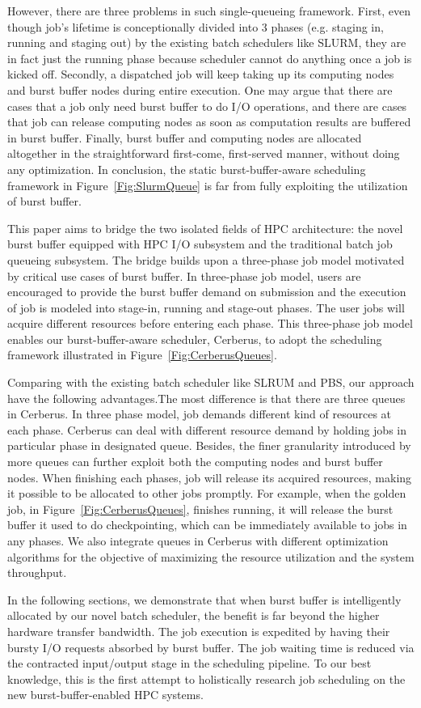 However, there are three problems in such single-queueing framework.
First, even though job's lifetime is conceptionally divided into 3 phases
(e.g. staging in, running and staging out) by the existing batch schedulers like SLURM,
they are in fact just the running phase because scheduler cannot do anything once a job is kicked off.
Secondly, a dispatched job will keep taking up its computing nodes and burst buffer nodes during entire execution.
One may argue that there are cases that a job only need burst buffer to do I/O operations,
and there are cases that job can release computing nodes as soon as computation results are buffered
in burst buffer.
Finally, burst buffer and computing nodes are allocated altogether
in the straightforward first-come, first-served manner, without doing any optimization.
In conclusion, the static burst-buffer-aware scheduling framework in Figure~\ref{Fig:SlurmQueue}
is far from fully exploiting the utilization of burst buffer.

This paper aims to bridge the two isolated fields of HPC architecture:
the novel burst buffer equipped with HPC I/O subsystem and the
traditional batch job queueing subsystem.
The bridge builds upon a three-phase job model motivated by critical use cases of burst buffer.
In three-phase job model, users are encouraged to provide the burst buffer demand on submission
and the execution of job is modeled into stage-in, running and stage-out phases.
The user jobs will acquire different resources before entering each phase.
This three-phase job model enables our burst-buffer-aware scheduler, Cerberus,
to adopt the scheduling framework illustrated in Figure~\ref{Fig:CerberusQueues}.

Comparing with the existing batch scheduler like SLRUM and PBS,
our approach have the following advantages.The most difference is that there are three queues in Cerberus.
In three phase model, job demands different kind of resources at each phase.
Cerberus can deal with different resource demand by holding jobs in particular phase in designated queue.
Besides, the finer granularity introduced by more queues can further exploit
both the computing nodes and burst buffer nodes.
When finishing each phases, job will release its acquired resources, making it possible
to be allocated to other jobs promptly.
For example, when the golden job, in Figure~\ref{Fig:CerberusQueues}, finishes running, it will release the burst buffer it used to
do checkpointing, which can be immediately available to jobs in any phases.
We also integrate queues in Cerberus with different optimization algorithms for the
objective of maximizing the resource utilization and the system throughput.

In the following sections, we demonstrate that when burst buffer is intelligently allocated
by our novel batch scheduler, the benefit is far beyond the higher hardware transfer bandwidth.
The job execution is expedited by having their bursty I/O requests absorbed by burst buffer.
The job waiting time is reduced via the contracted input/output stage in the scheduling pipeline.
To our best knowledge, this is the first attempt to holistically research job scheduling
on the new burst-buffer-enabled HPC systems.

